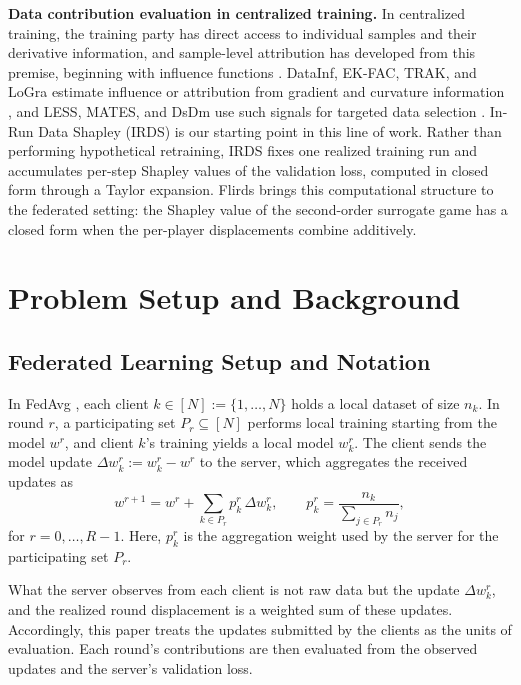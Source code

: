 \documentclass[letterpaper]{article} %
\theoremstyle{definition} %
\begin{document}
\noindent\textbf{Data contribution evaluation in centralized training.}
In centralized training, the training party has direct access to individual
samples and their derivative information, and sample-level attribution has
developed from this premise, beginning with influence functions
\citep{koh2017understanding}. DataInf, EK-FAC, TRAK, and LoGra estimate
influence or attribution from gradient and curvature information
\citep{kwon2024datainf,grosse2023studying,park2023trak,choe2026your}, and
LESS, MATES, and DsDm use such signals for targeted data selection
\citep{xia2024less,yu2024mates,engstrom2024dsdm}. In-Run Data Shapley (IRDS)
\citep{wang2025data} is our starting point in this line of work. Rather than
performing hypothetical retraining, IRDS fixes one realized training run and
accumulates per-step Shapley values of the validation loss, computed in closed
form through a Taylor expansion. Flirds brings this computational structure to
the federated setting: the Shapley value of the second-order surrogate game has
a closed form when the per-player displacements combine additively.

\section{Problem Setup and Background}
\label{sec:background}

\subsection{Federated Learning Setup and Notation}
\label{sec:fedavg}

In FedAvg \citep{mcmahan2016federated}, each client $k \in [N] := \{1,\dots,N\}$
holds a local dataset of size $n_k$. In round $r$, a participating set
$P_r \subseteq [N]$ performs local training starting from the model 
$w^r$, and client $k$'s training yields a local model $w_k^r$. The client sends
the model update $\Delta w_k^r := w_k^r - w^r$ to the server, which
aggregates the received updates as
\begin{equation}
\label{eq:fedavg}
w^{r+1}
= w^r + \sum_{k \in P_r} p_k^r\,\Delta w_k^r,
\qquad
p_k^r = \frac{n_k}{\sum_{j \in P_r} n_j},
\end{equation}
for $r=0,\dots,R-1$. Here, $p_k^r$ is the aggregation weight used by the server
for the participating set $P_r$.

What the server observes from each client is not raw data but the update
$\Delta w_k^r$, and the realized round displacement is a weighted
sum of these updates. Accordingly, this paper treats the updates submitted by the clients as the units of evaluation. Each round's contributions are then evaluated from the observed updates and the server's validation loss. 
\end{document}
